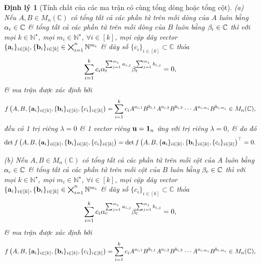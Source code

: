 \documentclass{article}
\newtheorem{dinhly}{Định lý}
\begin{document}
\begin{dinhly}[Tính chất của các ma trận có cùng tổng dòng hoặc tổng cột]
	(a) Nếu $A,B\in M_n(\mathbb{C})$ có tổng tất cả các phần tử trên mỗi dòng của $A$ luôn bằng $\alpha_{\rm r}\in\mathbb{C}$ \& tổng tất cả các phần tử trên mỗi dòng của $B$ luôn bằng $\beta_{\rm r}\in\mathbb{C}$ thì với mọi $k\in\mathbb{N}^\star$, mọi $m_i\in\mathbb{N}^\star$, $\forall i\in[k]$, mọi cặp dãy vector $\{{\bf a}_i\}_{i\in[k]},\{{\bf b}_i\}_{i\in[k]}\in\bigtimes_{i=1}^n \mathbb{N}^{m_i}$ \& dãy số $\{c_i\}_{i\in[k]}\subset\mathbb{C}$ thỏa
	\begin{equation*}
		\sum_{i=1}^k c_i\alpha_{\rm r}^{\sum_{j=1}^{m_i} a_{i,j}}\beta_{\rm r}^{\sum_{j=1}^{m_i} b_{i,j}} = 0,
	\end{equation*}
	\& ma trận được xác định bởi
	\begin{equation*}
		f\left(A,B,\{{\bf a}_i\}_{i\in[k]},\{{\bf b}_i\}_{i\in[k]},\{c_i\}_{i\in[k]}\right) = \sum_{i=1}^k c_iA^{a_{i,1}}B^{b_{i,1}}A^{a_{i,2}}B^{b_{i,2}}\cdots A^{a_{i,m_i}}B^{b_{i,m_i}}\in M_n(\mathbb{C}),
	\end{equation*}
	đều có 1 trị riêng $\lambda = 0$ \& 1 vector riêng ${\bf u} = {\bf1}_n$ ứng với trị riêng $\lambda = 0$, \& do đó
	\begin{equation*}
		\det f\left(A,B,\{{\bf a}_i\}_{i\in[k]},\{{\bf b}_i\}_{i\in[k]},\{c_i\}_{i\in[k]}\right) = \det f\left(A,B,\{{\bf a}_i\}_{i\in[k]},\{{\bf b}_i\}_{i\in[k]},\{c_i\}_{i\in[k]}\right)^\top = 0.
	\end{equation*}
	\item(b) Nếu $A,B\in M_n(\mathbb{C})$ có tổng tất cả các phần tử trên mỗi cột của $A$ luôn bằng $\alpha_{\rm c}\in\mathbb{C}$ \& tổng tất cả các phần tử trên mỗi cột của $B$ luôn bằng $\beta_{\rm c}\in\mathbb{C}$ thì với mọi $k\in\mathbb{N}^\star$, mọi $m_i\in\mathbb{N}^\star$, $\forall i\in[k]$, mọi cặp dãy vector $\{{\bf a}_i\}_{i\in[k]},\{{\bf b}_i\}_{i\in[k]}\in\bigtimes_{i=1}^n \mathbb{N}^{m_i}$ \& dãy số $\{c_i\}_{i\in[k]}\subset\mathbb{C}$ thỏa
	\begin{equation*}
		\sum_{i=1}^k c_i\alpha_{\rm c}^{\sum_{j=1}^{m_i} a_{i,j}}\beta_{\rm c}^{\sum_{j=1}^{m_i} b_{i,j}} = 0,
	\end{equation*}
	\& ma trận được xác định bởi
	\begin{equation*}
		f\left(A,B,\{{\bf a}_i\}_{i\in[k]},\{{\bf b}_i\}_{i\in[k]},\{c_i\}_{i\in[k]}\right) = \sum_{i=1}^k c_iA^{a_{i,1}}B^{b_{i,1}}A^{a_{i,2}}B^{b_{i,2}}\cdots A^{a_{i,m_i}}B^{b_{i,m_i}}\in M_n(\mathbb{C}),
	\end{equation*}

\end{dinhly}
\end{document}

